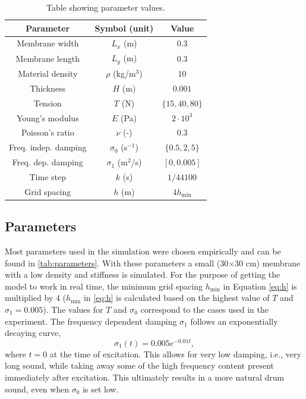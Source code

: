     \begin{table}[t]
    \centering
    \begin{tabular}{|c|c|c|}
        \hline
        Parameter & Symbol (unit) & Value \\
        \hline
        Membrane width & $L_x$ (m) & $0.3$\\
        Membrane length & $L_y$ (m) & $0.3$ \\
        Material density & $\rho$ (kg/m$^3$)& $10$ \\
        Thickness & $H$ (m) & $0.001$ \\
        Tension & $T$ (N) & $\{15, 40, 80\}$ \\
        Young's modulus & $E$ (Pa)& $2\cdot 10^3$ \\
        Poisson's ratio & $\nu$ (-)& $0.3$ \\
        Freq. indep. damping & $\sigma_0$ (s$^{-1}$) & $\{0.5, 2, 5\}$\\
        Freq. dep. damping & $\sigma_1$ (m$^2$/s) & $[0, 0.005]$\\
        Time step & $k$ (s) & $1/44100$\\
        Grid spacing & $h$ (m) & $4h_\text{min}$\\
        \hline
    \end{tabular}
    \caption{Table showing parameter values.}\label{tab:parameters}
    \end{table}
    
    \subsection{Parameters}
    Most parameters used in the simulation were chosen empirically and can be found in \autoref{tab:parameters}. With these parameters a small (30$\times$30 cm) membrane with a low density and stiffness is simulated. For the purpose of getting the model to work in real time, the minimum grid spacing $h_\text{min}$ in Equation \eqref{eq:h} is multiplied by 4 ($h_\text{min}$ in \eqref{eq:h} is calculated based on the highest value of $T$ and $\sigma_1 = 0.005$). The values for $T$ and $\sigma_0$ correspond to the cases used in the experiment. The frequency dependent damping  $\sigma_1$ follows an exponentially decaying curve, 
    \begin{equation}
        \sigma_1(t) = 0.005e^{-0.01 t},
    \end{equation}
    where $t=0$ at the time of excitation. This allows for very low damping, i.e., very long sound, while taking away some of the high frequency content present immediately after excitation. This ultimately results in a more natural drum sound, even when $\sigma_0$ is set low.
    
